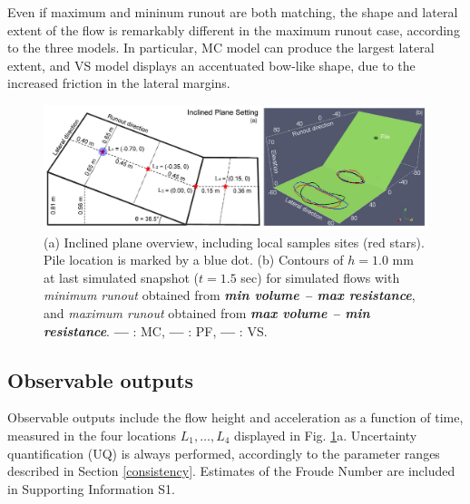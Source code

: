 \documentclass{article}
\begin{document}

Even if maximum and mininum runout are both matching, the shape and lateral extent of the flow is remarkably different in the maximum runout case, according to the three models. In particular, MC model can produce the largest lateral extent, and VS model displays an accentuated bow-like shape, due to the increased friction in the lateral margins.

\begin{figure}[H]
    \includegraphics[width=1\textwidth]{InclinedPlane/InclPlane_new.jpg}
    \centering
    \caption{(a) Inclined plane overview, including local samples sites (red stars). Pile location is marked by a blue dot. (b) Contours of $h = 1.0$ mm at last simulated snapshot ($t = 1.5$ sec) for simulated flows with \emph{minimum runout} obtained from \emph{\textbf{min volume -- max resistance}}, and \emph{maximum runout} obtained from \emph{\textbf{max volume -- min resistance}}. {\color{red} \textbf{---}} : MC, {\color{blue} \textbf{---}} : PF, \textbf{---} : VS.} \label{fig:Ramp-first}
\end{figure}

\subsection{Observable outputs} \label{Obs1}
Observable outputs include the flow height and acceleration as a function of time, measured in the four locations $L_1,\dots, L_4$ displayed in Fig. \ref{fig:Ramp-first}a. Uncertainty quantification (UQ) is always performed, accordingly to the parameter ranges described in Section \ref{consistency}. Estimates of the Froude Number are included in Supporting Information S1.
\end{document}
